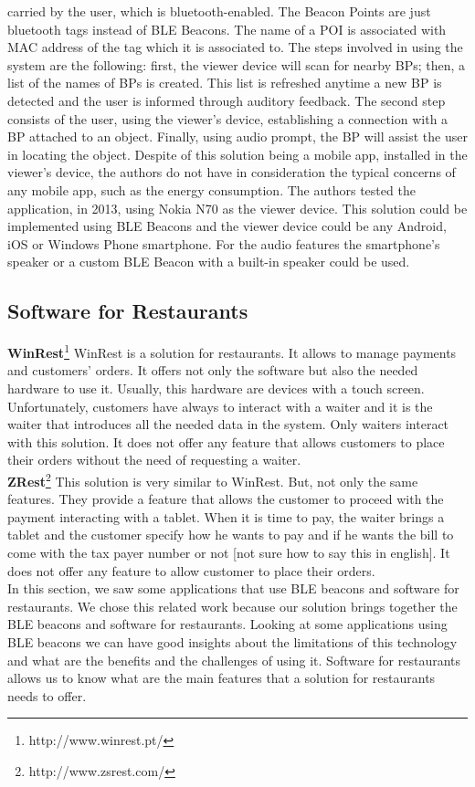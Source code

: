 carried by the user, which is bluetooth-enabled.
The Beacon Points are just bluetooth tags instead of
BLE Beacons. The name of a POI is associated with
MAC address of the tag which it is associated to.
The steps involved in using the system are the
following: first, the viewer device will scan
for nearby BPs; then, a list of the names of
BPs is created. This list is refreshed anytime a new
BP is detected and the user is informed through auditory
feedback. The second step consists of the user, using
the viewer's device, establishing a connection with a BP
attached to an object. Finally, using audio prompt, the BP
will assist the user in locating the object.
Despite of this solution being a mobile app, installed
in the viewer's device, the authors do not have in
consideration the typical concerns of any mobile app,
such as the energy consumption.
The authors tested the application, in 2013,
using Nokia N70 as the viewer device.
This solution could be implemented using BLE Beacons
and the viewer device could be any Android, iOS or
Windows Phone smartphone.
For the audio features the smartphone's speaker or
a custom BLE Beacon with a built-in speaker could be
used.

\subsection{Software for Restaurants}
\label{subs:software_for_restaurants}
\textbf{WinRest}\footnote{http://www.winrest.pt/}
WinRest is a solution for restaurants. It allows to manage payments
and customers' orders. It offers not only the software but also the
needed hardware to use it. Usually, this hardware are devices with
a touch screen. Unfortunately, customers have always to interact
with a waiter and it is the waiter that introduces all the needed data
in the system. Only waiters interact with this solution. It does not
offer any feature that allows customers to place their orders
without the need of requesting a waiter.
\\
\textbf{ZRest}\footnote{http://www.zsrest.com/}
This solution is very similar to WinRest.
But, not only the same features. They provide a feature that allows the
customer to proceed with the payment interacting with a tablet.
When it is time to pay, the waiter brings a tablet and the customer
specify how he wants to pay and if he wants the bill to come with
the tax payer number or not [not sure how to say this in english].
It does not offer any feature to allow customer to place their orders.
\\

In this section, we saw some applications that use BLE beacons and software
for restaurants. We chose this related work because our solution
brings together the BLE beacons and software for restaurants.
Looking at some applications using BLE beacons we can have good insights
about the limitations of this technology and what are the benefits and
the challenges of using it.
Software for restaurants allows us to know what are the main features
that a solution for restaurants needs to offer.

